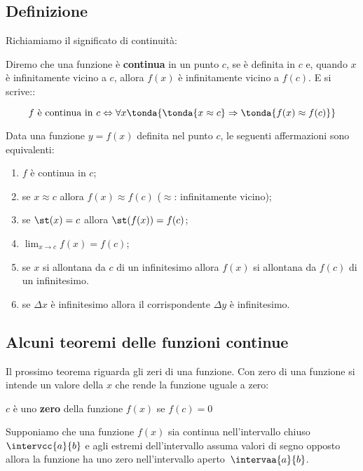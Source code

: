 \subsection{Definizione}
\label{sec:cont_definizione}

Richiamiamo il significato di continuità:

\begin{definizione}
Diremo che una funzione è \textbf{continua} in un punto \(c\), 
se è definita in \(c\) e, 
quando \(x\) è infinitamente vicino a \(c\), 
allora \(f(x)\) è infinitamente vicino a \(f(c)\). E si scrive::

\[f \text{ è continua in } c \Leftrightarrow 
\forall x \tonda{\tonda{x \approx c} \Rightarrow 
\tonda{f(x) \approx f(c)}}\]
\end{definizione}

Data una funzione \(y=f(x)\) definita nel punto \(c\), le seguenti 
affermazioni sono equivalenti:

\begin{enumerate}[noitemsep]
 \item \(f\) è continua in \(c\);
 \item se \(x \approx c\) allora \(f(x) \approx f(c)\) 
       (\(\approx\): infinitamente vicino);
 \item se \(\st(x) = c\) allora \(\st(f(x)) = f(c)\);
 \item \(\lim_{x \to c} f(x) = f(c)\);
 \item se \(x\) si allontana da \(c\) di un infinitesimo allora 
   \(f(x)\) si allontana da \(f(c)\) di un infinitesimo.
 \item se \(\Delta x\) è infinitesimo allora il corrispondente \(\Delta y\) 
   è infinitesimo.
\end{enumerate}

\subsection{Alcuni teoremi delle funzioni continue}
\label{subsec:cont_iperinteri}

Il prossimo teorema riguarda gli zeri di una funzione. Con zero di una 
funzione 
si intende un valore della \(x\) che rende la funzione uguale a zero:

\begin{definizione}
 \(c\) è uno \textbf{zero} della funzione \(f(x)\) se \(f(c)=0\)
\end{definizione}

\begin{teorema}
Supponiamo che una funzione \(f(x)\) sia continua nell'intervallo chiuso
\(\intervcc{a}{b}\) e agli estremi dell'intervallo assuma valori di segno 
opposto allora la funzione ha uno zero nell'intervallo 
aperto~\(\intervaa{a}{b}\).
\end{teorema}

